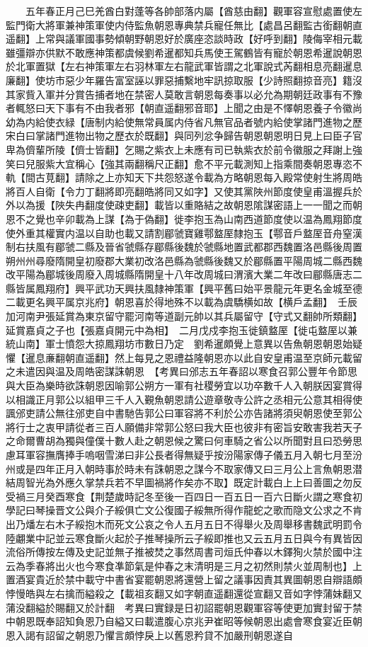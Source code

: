 　　五年春正月己巳羌酋白對蓬等各帥部落内屬【酋慈由翻】觀軍容宣慰處置使左監門衛大將軍兼神策軍使内侍監魚朝恩專典禁兵寵任無比【處昌呂翻監古銜翻朝直遥翻】上常與議軍國事勢傾朝野朝恩好於廣座恣談時政【好呼到翻】陵侮宰相元載雖彊辯亦供默不敢應神策都虞候劉希暹都知兵馬使王駕鶴皆有寵於朝恩希暹說朝恩於北軍置獄【左右神策軍左右羽林軍左右龍武軍皆謂之北軍說式芮翻相息亮翻暹息廉翻】使坊市惡少年羅告富室誣以罪惡捕繫地牢訊掠取服【少詩照翻掠音亮】籍沒其家貲入軍并分賞告捕者地在禁密人莫敢言朝恩每奏事以必允為期朝廷政事有不豫者輒怒曰天下事有不由我者邪【朝直遥翻邪音耶】上聞之由是不懌朝恩養子令徽尚幼為内給使衣緑【唐制内給使無常員属内侍省凡無官品者號内給使掌諸門進物之歷宋白曰掌諸門進物出物之歷衣於既翻】與同列忿争歸告朝恩朝恩明日見上曰臣子官卑為儕輩所陵【儕士皆翻】乞賜之紫衣上未應有司已執紫衣於前令徽服之拜謝上強笑曰兒服紫大宜稱心【強其兩翻稱尺正翻】愈不平元載測知上指乘間奏朝恩專恣不軌【間古莧翻】請除之上亦知天下共怨怒遂令載為方略朝恩每入殿常使射生將周皓將百人自衛【令力丁翻將即亮翻皓將同又如字】又使其黨陜州節度使皇甫溫握兵於外以為援【陜失冉翻度使疎吏翻】載皆以重賂結之故朝恩隂謀密語上一一聞之而朝恩不之覺也辛卯載為上謀【為于偽翻】徙李抱玉為山南西道節度使以温為鳳翔節度使外重其權實内温以自助也載又請割郿虢寶雞鄠盩厔隸抱玉【鄠音戶盩厔音舟窒漢制右扶風有郿虢二縣及晉省虢縣存郿縣後魏於虢縣地置武都郡西魏置洛邑縣後周置朔州州尋廢隋開皇初廢郡大業初改洛邑縣為虢縣後魏又於郿縣置平陽周城二縣西魏改平陽為郿城後周廢入周城縣隋開皇十八年改周城曰渭濱大業二年改曰郿縣唐志二縣皆属鳳翔府】興平武功天興扶風隸神策軍【興平舊曰始平景龍元年更名金城至德二載更名興平属京兆府】朝恩喜於得地殊不以載為虞驕横如故【横戶孟翻】　壬辰加河南尹張延賞為東京留守罷河南等道副元帥以其兵屬留守【守式又翻帥所類翻】延賞嘉貞之子也【張嘉貞開元中為相】　二月戊戍李抱玉徙鎮盩厔【徙屯盩厔以兼統山南】軍士憤怨大掠鳳翔坊市數日乃定　劉希暹頗覺上意異以告魚朝恩朝恩始疑懼【暹息亷翻朝直遥翻】然上每見之恩禮益隆朝恩亦以此自安皇甫温至京師元載留之未遣因與温及周皓密謀誅朝恩　【考異曰邠志五年春詔以寒食召郭公豐年令節思與大臣為樂時欲誅朝恩因喻郭公朔方一軍有社稷勞宜以功卒數千人入朝朕因宴賞得以相識正月郭公以組甲三千人入覲魚朝恩請公遊章敬寺公許之丞相元公意其相得使諷邠吏請公無往邠吏自中書馳告郭公曰軍容將不利於公亦告諸將須臾朝恩使至郭公將行士之衷甲請從者三百人願備非常郭公怒曰我大臣也彼非有密旨安敢害我若天子之命爾曹胡為獨與僮僕十數人赴之朝恩候之驚曰何車騎之省公以所聞對且曰恐勞思慮耳軍容撫膺捧手嗚咽雪涕曰非公長者得無疑乎按汾陽家傳子儀五月入朝七月至汾州或是四年正月入朝時事於時未有誅朝恩之謀今不取家傳又曰三月公上言魚朝恩潜結周智光為外應久掌禁兵若不早圖禍將作矣亦不取】既定計載白上上曰善圖之勿反受禍三月癸酉寒食【荆楚歲時記冬至後一百四日一百五日一百六日斷火謂之寒食初學記曰琴操晋文公與介子綏俱亡文公復國子綏無所得作龍蛇之歌而隐文公求之不肯出乃燔左右木子綏抱木而死文公哀之令人五月五日不得舉火及周舉移書魏武明罰令陸翽業中記並云寒食斷火起於子推琴操所云子綏即推也又云五月五日與今有異皆因流俗所傳按左傳及史記並無子推被焚之事然周書司烜氏仲春以木鐸狥火禁於國中注云為季春將出火也今寒食凖節氣是仲春之末清明是三月之初然則禁火並周制也】上置酒宴貴近於禁中載守中書省宴罷朝恩將還營上留之議事因責其異圖朝恩自辯語頗悖慢皓與左右擒而縊殺之【載祖亥翻又如字朝直遥翻還從宣翻又音如字悖蒲妹翻又蒲没翻縊於賜翻又於計翻　考異曰實録是日初詔罷朝恩觀軍容等使更加實封留于禁中朝恩既奉詔知負恩乃自縊又曰載遣腹心京兆尹崔昭等候朝恩出處會寒食宴近臣朝恩入謁有詔留之朝恩乃懼言頗悖戾上以舊恩矜貸不加嚴刑朝恩遂自